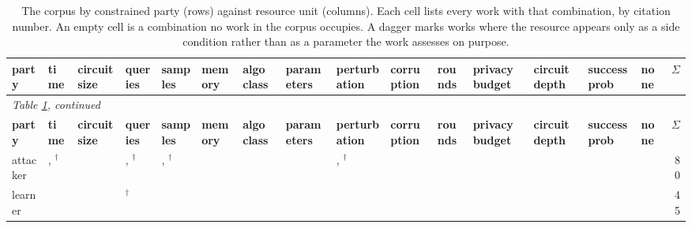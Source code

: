 \begin{landscape}
\begingroup\scriptsize\setlength{\tabcolsep}{3pt}
\begin{longtable}{lp{1.70cm}p{1.70cm}p{1.70cm}p{1.70cm}p{1.70cm}p{1.70cm}p{1.70cm}p{1.70cm}p{1.70cm}p{1.70cm}p{1.70cm}p{1.70cm}p{1.70cm}p{1.70cm}r}
\caption{The corpus by constrained party (rows) against resource unit (columns). Each cell lists every work with that combination, by citation number. An empty cell is a combination no work in the corpus occupies. A dagger marks works where the resource appears only as a side condition rather than as a parameter the work assesses on purpose.}\label{tab:party-unit}\\
\toprule \textbf{party} & \textbf{time} & \textbf{circuit size} & \textbf{queries} & \textbf{samples} & \textbf{memory} & \textbf{algo class} & \textbf{parameters} & \textbf{perturbation} & \textbf{corruption} & \textbf{rounds} & \textbf{privacy budget} & \textbf{circuit depth} & \textbf{success prob} & \textbf{none} & \textbf{$\Sigma$} \\ \midrule\endfirsthead
\multicolumn{16}{l}{\emph{Table \ref{tab:party-unit}, continued}}\\
\toprule \textbf{party} & \textbf{time} & \textbf{circuit size} & \textbf{queries} & \textbf{samples} & \textbf{memory} & \textbf{algo class} & \textbf{parameters} & \textbf{perturbation} & \textbf{corruption} & \textbf{rounds} & \textbf{privacy budget} & \textbf{circuit depth} & \textbf{success prob} & \textbf{none} & \textbf{$\Sigma$} \\ \midrule\endhead
\bottomrule\endfoot
attacker & \cite{AHY25,BCS24,BGHKP24,BRSV17,CK21,CKMMNST24,DJYWWMNL26,DKLP22,DN03,DP20,EMM20,GKY11,HMSTY25,JYCDTCP21,LLW19,MPRV09,MR25,VDKMR26,XSD24}, \cite{BDJV22,CCNSTT22,FJTYCDCP23,SSZHTE24,ZCSL24,ZFWCSXZ26}$^\dagger$ & \cite{ABIKN23,BC22,BJRZ24,BW08,GHJS25,GJMM20} & \cite{ACMS23,BM09,CCGJY19,HU14,ML24}, \cite{CCHRSS24,CJM20,FK24,NCM25,SSSS17}$^\dagger$ & \cite{HSU25}, \cite{SE22}$^\dagger$ & \cite{BCEQ24,DQW21,DQW22,GZ19} & \cite{BBHLS21,CIM19,DVV16,JCBKP20,WSPX24} &  & \cite{ACW18,CASDFCMH21,CRK19,CYDS26,DMM19,FFF18,GMFSRWG18,HDDH25,LAGHJ19,MDM19,MZME19,Mah19,PSV23,SLDLN25,SSTTM18,SWKBC25,SYLZZRB19,TCBM20,TSETM19,WK18}, \cite{CAPBRTGMK19,CGBSHC22}$^\dagger$ & \cite{LCMER25,LXSWLGZX25,MMM19,RT23,SKL17} &  &  & \cite{GM24} &  &  & 80 \\
learner & \cite{AS24,BB20,BHJK25,BIS17,BJ23,BLPR18,BRST21,DHSS25,DKKLMS16,DLSW25,DNV19,HN23,HW21,KPR25,LZZ24,SZB21,ZSWB22} & \cite{GJW22a} & \cite{BBHS22}$^\dagger$ & \cite{AH23,CBM18,DIKR25,DKLM26,DLB25,DPLB24,DTAPZK24,MHS19,MHS22,WZDD24} & \cite{Raz16} & \cite{ABM22,ABM23,AGJ21,BAHSWZ22,BPR19,CGGV25,DGKP19,EGV25,FGRVX17,GJW22b,KLNRS08,SW22,Wei25} & \cite{BS21,GJMMW22} &  &  &  &  &  &  &  & 45 \\

\end{longtable}
\end{landscape}
